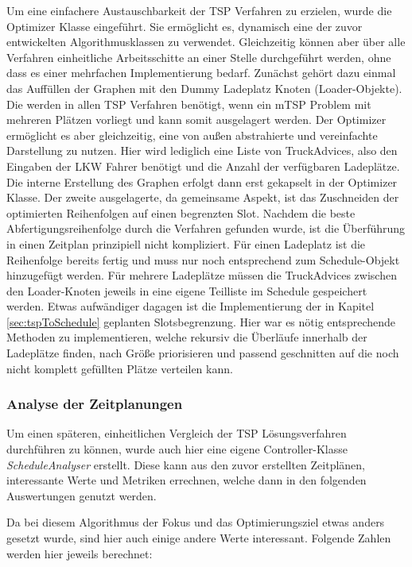 Um eine einfachere Austauschbarkeit der TSP Verfahren zu erzielen, wurde die Optimizer Klasse eingeführt. Sie ermöglicht es, dynamisch eine der zuvor entwickelten Algorithmusklassen zu verwendet. Gleichzeitig können aber über alle Verfahren einheitliche Arbeitsschitte an einer Stelle durchgeführt werden, ohne dass es einer mehrfachen Implementierung bedarf. Zunächst gehört dazu einmal das Auffüllen der Graphen mit den Dummy Ladeplatz Knoten (Loader-Objekte). Die werden in allen TSP Verfahren benötigt, wenn ein mTSP Problem mit mehreren Plätzen vorliegt und kann somit ausgelagert werden. Der Optimizer ermöglicht es aber gleichzeitig, eine von außen abstrahierte und vereinfachte Darstellung zu nutzen. Hier wird lediglich eine Liste von TruckAdvices, also den Eingaben der LKW Fahrer benötigt und die Anzahl der verfügbaren Ladeplätze. Die interne Erstellung des Graphen erfolgt dann erst gekapselt in der Optimizer Klasse. Der zweite ausgelagerte, da gemeinsame Aspekt, ist das Zuschneiden der optimierten Reihenfolgen auf einen begrenzten Slot. Nachdem die beste Abfertigungsreihenfolge durch die Verfahren gefunden wurde, ist die Überführung in einen Zeitplan prinzipiell nicht kompliziert. Für einen Ladeplatz ist die Reihenfolge bereits fertig und muss nur noch entsprechend zum Schedule-Objekt hinzugefügt werden. Für mehrere Ladeplätze müssen die TruckAdvices zwischen den Loader-Knoten jeweils in eine eigene Teilliste im Schedule gespeichert werden. Etwas aufwändiger dagagen ist die Implementierung der in Kapitel \ref{sec:tspToSchedule} geplanten Slotsbegrenzung. Hier war es nötig entsprechende Methoden zu implementieren, welche rekursiv die Überläufe innerhalb der Ladeplätze finden, nach Größe priorisieren und passend geschnitten auf die noch nicht komplett gefüllten Plätze verteilen kann.


\subsubsection{Analyse der Zeitplanungen}


Um einen späteren, einheitlichen Vergleich der TSP Lösungsverfahren durchführen zu können, wurde auch hier eine eigene Controller-Klasse \textit{ScheduleAnalyser} erstellt. Diese kann aus den zuvor erstellten Zeitplänen, interessante Werte und Metriken errechnen, welche dann in den folgenden Auswertungen genutzt werden.

Da bei diesem Algorithmus der Fokus und das Optimierungsziel etwas anders gesetzt wurde, sind hier auch einige andere Werte interessant. Folgende Zahlen werden hier jeweils berechnet:

